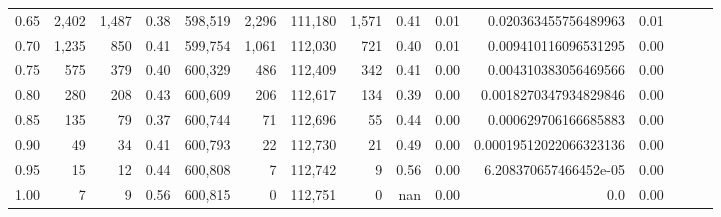 \begin{tabular}{rrrrrrrrrrrrrrr}
0.65 &    2,402 &   1,487 &  0.38 &  598,519 &    2,296 &  111,180 &    1,571 &  0.41 &  0.01 &    0.020363455756489963 &      0.01 \\
0.70 &    1,235 &     850 &  0.41 &  599,754 &    1,061 &  112,030 &      721 &  0.40 &  0.01 &    0.009410116096531295 &      0.00 \\
0.75 &      575 &     379 &  0.40 &  600,329 &      486 &  112,409 &      342 &  0.41 &  0.00 &    0.004310383056469566 &      0.00 \\
0.80 &      280 &     208 &  0.43 &  600,609 &      206 &  112,617 &      134 &  0.39 &  0.00 &   0.0018270347934829846 &      0.00 \\
0.85 &      135 &      79 &  0.37 &  600,744 &       71 &  112,696 &       55 &  0.44 &  0.00 &    0.000629706166685883 &      0.00 \\
0.90 &       49 &      34 &  0.41 &  600,793 &       22 &  112,730 &       21 &  0.49 &  0.00 &  0.00019512022066323136 &      0.00 \\
0.95 &       15 &      12 &  0.44 &  600,808 &        7 &  112,742 &        9 &  0.56 &  0.00 &   6.208370657466452e-05 &      0.00 \\
1.00 &        7 &       9 &  0.56 &  600,815 &        0 &  112,751 &        0 &   nan &  0.00 &                     0.0 &      0.00 \\
\bottomrule
\end{tabular}
